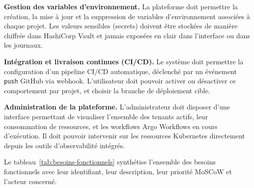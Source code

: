\textbf{Gestion des variables d'environnement.} La plateforme doit permettre la création, la mise à jour et la suppression de variables d'environnement associées à chaque projet. Les valeurs sensibles (secrets) doivent être stockées de manière chiffrée dans HashiCorp Vault et jamais exposées en clair dans l'interface ou dans les journaux.

\textbf{Intégration et livraison continues (CI/CD).} Le système doit permettre la configuration d'un pipeline CI/CD automatique, déclenché par un événement \texttt{push} GitHub via webhook. L'utilisateur doit pouvoir activer ou désactiver ce comportement par projet, et choisir la branche de déploiement cible.

\textbf{Administration de la plateforme.} L'administrateur doit disposer d'une interface permettant de visualiser l'ensemble des tenants actifs, leur consommation de ressources, et les workflows Argo Workflows en cours d'exécution. Il doit pouvoir intervenir sur les ressources Kubernetes directement depuis les outils d'observabilité intégrés.

Le tableau~\ref{tab:besoins-fonctionnels} synthétise l'ensemble des besoins fonctionnels avec leur identifiant, leur description, leur priorité MoSCoW et l'acteur concerné.

